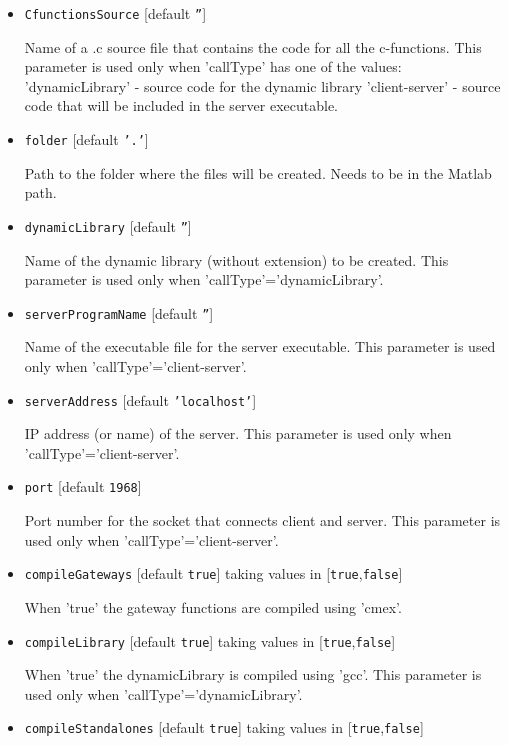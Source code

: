 \begin{itemize}
\item \texttt{CfunctionsSource} [default \texttt{''}]

   Name of a .c source file that contains the code for all the c-functions.   
This parameter is used only when 'callType' has one of the values:   
'dynamicLibrary'      - source code for the dynamic library   
'client-server'       - source code that will be included in the    
                          server executable.

\item \texttt{folder} [default \texttt{'.'}]

   Path to the folder where the files will be created.   
Needs to be in the Matlab path.

\item \texttt{dynamicLibrary} [default \texttt{''}]

   Name of the dynamic library (without extension) to be created.   
This parameter is used only when 'callType'='dynamicLibrary'.

\item \texttt{serverProgramName} [default \texttt{''}]

   Name of the executable file for the server executable.   
This parameter is used only when 'callType'='client-server'.

\item \texttt{serverAddress} [default \texttt{'localhost'}]

   IP address (or name) of the server.   
This parameter is used only when 'callType'='client-server'.

\item \texttt{port} [default \texttt{1968}]

   Port number for the socket that connects client and server.   
This parameter is used only when 'callType'='client-server'.

\item \texttt{compileGateways} [default \texttt{true}] taking values in [\texttt{true},\texttt{false}]

   When 'true' the gateway functions are compiled using 'cmex'.

\item \texttt{compileLibrary} [default \texttt{true}] taking values in [\texttt{true},\texttt{false}]

   When 'true' the dynamicLibrary is compiled using 'gcc'.   
This parameter is used only when 'callType'='dynamicLibrary'.

\item \texttt{compileStandalones} [default \texttt{true}] taking values in [\texttt{true},\texttt{false}]


\end{itemize}
